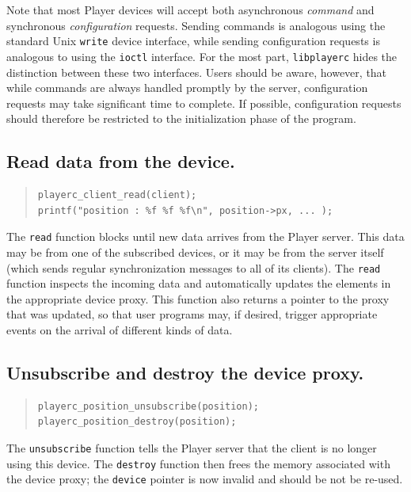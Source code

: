 \documentclass[11pt]{report}
\begin{document}
Note that most Player devices will accept both asynchronous {\em
command} and synchronous {\em configuration} requests.  Sending
commands is analogous using the standard Unix {\tt write} device
interface, while sending configuration requests is analogous to using
the {\tt ioctl} interface.  For the most part, {\tt libplayerc} hides
the distinction between these two interfaces.  Users should be aware,
however, that while commands are always handled promptly by the
server, configuration requests may take significant time to complete.
If possible, configuration requests should therefore be restricted to
the initialization phase of the program.

\subsection*{Read data from the device.}

\begin{quote}\begin{verbatim}
playerc_client_read(client);
printf("position : %f %f %f\n", position->px, ... );
\end{verbatim}\end{quote}
The {\tt read} function blocks until new data arrives from the Player
server.  This data may be from one of the subscribed devices, or it
may be from the server itself (which sends regular synchronization
messages to all of its clients).  The {\tt read} function inspects the
incoming data and automatically updates the elements in the
appropriate device proxy.  This function also returns a pointer to the
proxy that was updated, so that user programs may, if desired, trigger
appropriate events on the arrival of different kinds of data.

\subsection*{Unsubscribe and destroy the device proxy.}

\begin{quote}\begin{verbatim}
playerc_position_unsubscribe(position);
playerc_position_destroy(position);
\end{verbatim}\end{quote}
The {\tt unsubscribe} function tells the Player server that the client
is no longer using this device.  The {\tt destroy} function then frees
the memory associated with the device proxy; the {\tt device} pointer
is now invalid and should be not be re-used.
\end{document}
